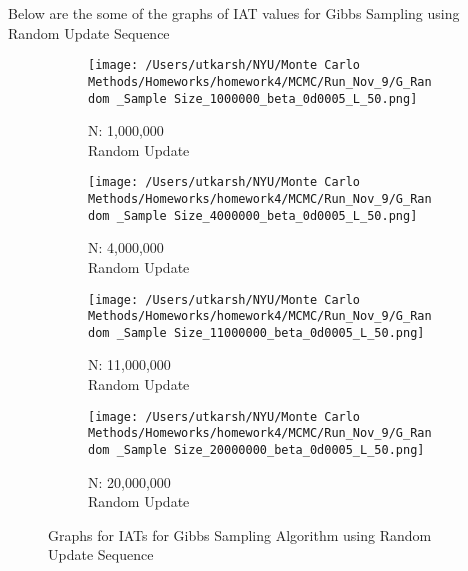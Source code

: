 \documentclass[11pt]{article}
\begin{document}
\noindent Below are the some of the graphs of IAT values for Gibbs Sampling using Random Update Sequence
\begin{figure}[H]
	\centering
	\begin{subfigure}{.22\textwidth}
		\texttt{[image: /Users/utkarsh/NYU/Monte Carlo Methods/Homeworks/homework4/MCMC/Run\_Nov\_9/G\_Random \_Sample Size\_1000000\_beta\_0d0005\_L\_50.png]}
		\caption{N: 1,000,000\\Random Update}
	\end{subfigure}
	\begin{subfigure}{.22\textwidth}
		\texttt{[image: /Users/utkarsh/NYU/Monte Carlo Methods/Homeworks/homework4/MCMC/Run\_Nov\_9/G\_Random \_Sample Size\_4000000\_beta\_0d0005\_L\_50.png]}
		\caption{N: 4,000,000\\Random Update}
	\end{subfigure}
	\begin{subfigure}{.22\textwidth}
		\texttt{[image: /Users/utkarsh/NYU/Monte Carlo Methods/Homeworks/homework4/MCMC/Run\_Nov\_9/G\_Random \_Sample Size\_11000000\_beta\_0d0005\_L\_50.png]}
		\caption{N: 11,000,000\\Random Update}
	\end{subfigure}
	\begin{subfigure}{.22\textwidth}
		\texttt{[image: /Users/utkarsh/NYU/Monte Carlo Methods/Homeworks/homework4/MCMC/Run\_Nov\_9/G\_Random \_Sample Size\_20000000\_beta\_0d0005\_L\_50.png]}
		\caption{N: 20,000,000\\Random Update}
	\end{subfigure}
	\caption{Graphs for IATs for Gibbs Sampling Algorithm using Random Update Sequence}
	\label{fig:iat_gibbs_random}
\end{figure}
\end{document}
